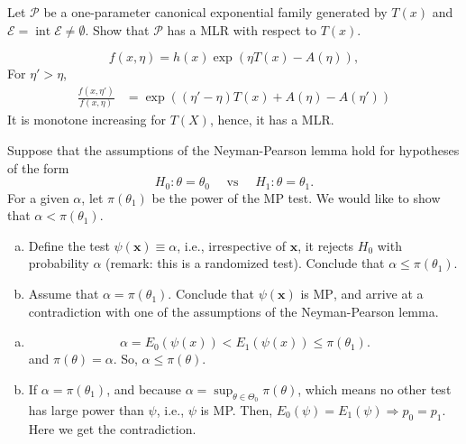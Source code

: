 \begin{ex}
    Let \(\mathcal{P}\) be a one-parameter canonical exponential family generated by \(T(x)\) and \(\mathcal{E}=\operatorname{int} \mathcal{E} \neq \emptyset\). Show that \(\mathcal{P}\) has a MLR with respect to \(T(x)\). 
\end{ex}

\begin{solution}
    \[
        f(x, \eta)=h(x)\exp\left(\eta T(x)-A(\eta)\right), 
    \]
    For $\eta'>\eta$, 
    \[
        \begin{aligned}
            \frac{f(x,\eta')}{f(x,\eta)}&=\exp\left((\eta'-\eta)T(x)+A(\eta)-A(\eta')\right)
        \end{aligned}
    \]
    It is monotone increasing for $T(X)$, hence, it has a MLR. 
\end{solution}

\begin{ex}
    Suppose that the assumptions of the Neyman-Pearson lemma hold for hypotheses of the form
    \[
        H_{0}: \theta=\theta_{0} \quad \text { vs } \quad H_{1}: \theta=\theta_{1} .
    \]
    For a given \(\alpha\), let \(\pi\left(\theta_{1}\right)\) be the power of the MP test. We would like to show that \(\alpha<\pi\left(\theta_{1}\right)\). 
    \begin{enumerate}[(a)]
        \item Define the test \(\psi(\mathbf{x}) \equiv \alpha\), i.e., irrespective of \(\mathbf{x}\), it rejects \(H_{0}\) with probability \(\alpha\) (remark: this is a randomized test). Conclude that \(\alpha \leq \pi\left(\theta_{1}\right)\). 
        \item Assume that \(\alpha=\pi\left(\theta_{1}\right)\). Conclude that \(\psi(\mathbf{x})\) is \(\mathrm{MP}\), and arrive at a contradiction with one of the assumptions of the Neyman-Pearson lemma. 
    \end{enumerate}
\end{ex}

\begin{solution}
    \begin{enumerate}[(a)]
        \item \[\alpha=E_0(\psi(x))< E_1(\psi(x))\leqslant\pi(\theta_1). \]
        and $\pi(\theta)=\alpha$. So, $\alpha\leqslant\pi(\theta)$. 
        \item If $\alpha=\pi(\theta_1)$, and because $\alpha=\sup_{\theta\in\Theta_0}\pi(\theta)$, which means no other test has large power than $\psi$, i.e., $\psi$ is MP. Then, $E_0(\psi)=E_1(\psi)\Rightarrow p_0=p_1$. Here we get the contradiction. 
    \end{enumerate}
\end{solution}

